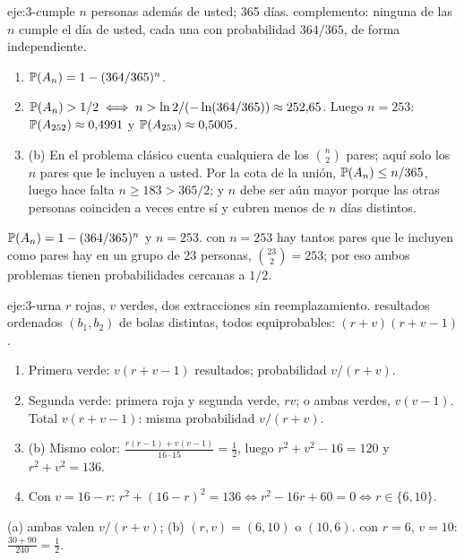 \begin{solucion}{eje:3-cumple}
\datos $n$ personas además de usted; 365 días.
\planteamiento complemento: ninguna de las $n$ cumple el día de usted, cada una con probabilidad $364/365$, de forma independiente.
\pasos
\begin{enumerate}[label=\arabic*.]
  \item $\mathbb{P}(A_n)=1-(364/365)^{n}$.
  \item $\mathbb{P}(A_n)>1/2\iff n>\ln2/(-\ln(364/365))\approx252{,}65$. Luego $n=253$: $\mathbb{P}(A_{252})\approx0{,}4991$ y $\mathbb{P}(A_{253})\approx0{,}5005$.
  \item (b) En el problema clásico cuenta cualquiera de los $\binom{n}{2}$ pares; aquí solo los $n$ pares que le incluyen a usted. Por la cota de la unión, $\mathbb{P}(A_n)\le n/365$, luego hace falta $n\ge183>365/2$; y $n$ debe ser aún mayor porque las otras personas coinciden a veces entre sí y cubren menos de $n$ días distintos.
\end{enumerate}
\resultado $\mathbb{P}(A_n)=1-(364/365)^{n}$ y $n=253$.
\comprobacion con $n=253$ hay tantos pares que le incluyen como pares hay en un grupo de 23 personas, $\binom{23}2=253$; por eso ambos problemas tienen probabilidades cercanas a $1/2$.
\end{solucion}

\begin{solucion}{eje:3-urna}
\datos $r$ rojas, $v$ verdes, dos extracciones sin reemplazamiento.
\planteamiento resultados ordenados $(b_1,b_2)$ de bolas distintas, todos equiprobables: $(r+v)(r+v-1)$.
\pasos
\begin{enumerate}[label=\arabic*.]
  \item Primera verde: $v(r+v-1)$ resultados; probabilidad $v/(r+v)$.
  \item Segunda verde: primera roja y segunda verde, $rv$; o ambas verdes, $v(v-1)$. Total $v(r+v-1)$: misma probabilidad $v/(r+v)$.
  \item (b) Mismo color: $\frac{r(r-1)+v(v-1)}{16\cdot15}=\frac12$, luego $r^{2}+v^{2}-16=120$ y $r^{2}+v^{2}=136$.
  \item Con $v=16-r$: $r^{2}+(16-r)^{2}=136\iff r^{2}-16r+60=0\iff r\in\{6,10\}$.
\end{enumerate}
\resultado (a) ambas valen $v/(r+v)$; (b) $(r,v)=(6,10)$ o $(10,6)$.
\comprobacion con $r=6$, $v=10$: $\frac{30+90}{240}=\frac12$.
\end{solucion}

